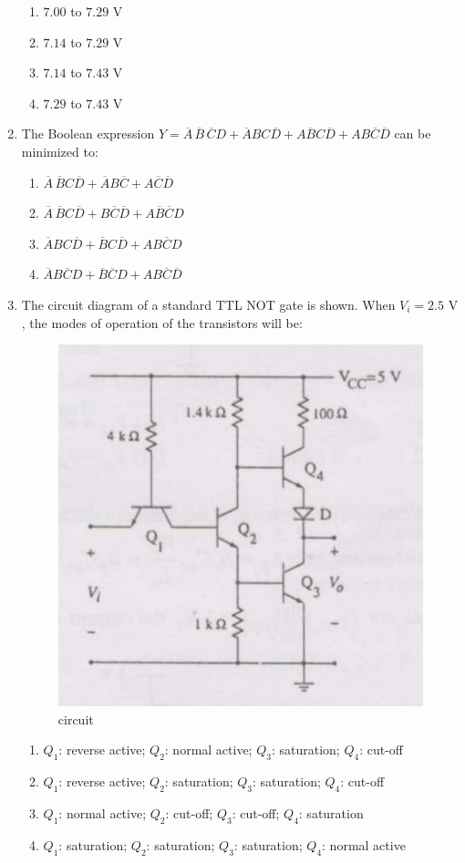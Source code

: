 \documentclass[journal,12pt,onecolumn]{IEEEtran}
\theoremstyle{remark}
\begin{document}
\begin{enumerate}
\hfill{}
\begin{enumerate}[label=(\Alph*)]
    \item $7.00$ to $7.29$ V
    \item $7.14$ to $7.29$ V
    \item $7.14$ to $7.43$ V
    \item $7.29$ to $7.43$ V
\end{enumerate}

\item The Boolean expression  
$
Y = \overline{A} \,\overline{B}\,\overline{C} D + \overline{A} B C \overline{D} + A \overline{B} C \overline{D} + A B \overline{C} \overline{D}
$
can be minimized to: 
\hfill{}
\begin{enumerate}
  \item $\overline{A} \,\overline{B} C \overline{D} + \overline{A} B \overline{C} + A \overline{C} \overline{D}$
  \item $\overline{A} \,\overline{B} C \overline{D} + B \overline{C} \overline{D} + A \overline{B} \overline{C} D$
  \item $\overline{A} B C \overline{D} + \overline{B} C \overline{D} + A B \overline{C} D$
  \item $\overline{A} B \overline{C} D + \overline{B} \overline{C} D + A B \overline{C} \overline{D}$
\end{enumerate}

\item The circuit diagram of a standard TTL NOT gate is shown. When $V_i = 2.5\text{ V}$, the modes of operation of the transistors will be: 

\begin{figure}[H]
    \centering
    \includegraphics[width=0.4\linewidth]{Q42.jpg}
    \caption{circuit}
    \label{fig:full_wave}
\end{figure}

\hfill{}
\begin{enumerate}
  \item $Q_1$: reverse active; $Q_2$: normal active; $Q_3$: saturation; $Q_4$: cut-off
  \item $Q_1$: reverse active; $Q_2$: saturation; $Q_3$: saturation; $Q_4$: cut-off
  \item $Q_1$: normal active; $Q_2$: cut-off; $Q_3$: cut-off; $Q_4$: saturation
  \item $Q_1$: saturation; $Q_2$: saturation; $Q_3$: saturation; $Q_4$: normal active
\end{enumerate}


\end{enumerate}
\end{document}
